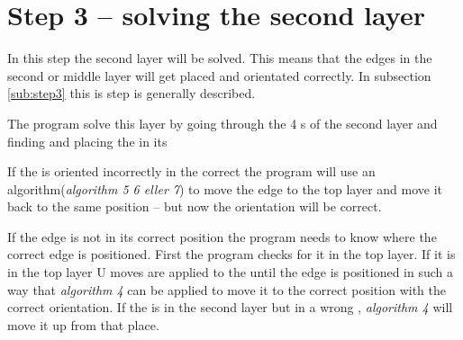 \section{Step 3 -- solving the second layer}
In this step the second layer will be solved. 
This means that the edges in the second or middle layer will get placed and orientated correctly. 
In subsection \ref{sub:step3} this is step is generally described. 

The program solve this layer by going through the 4 \cubicle{}s of the second layer and finding and placing the \cpiece{} in its \cubicle{}

If the \cpiece is oriented incorrectly in the correct \cubicle{} the program will use an algorithm(\textit{algorithm 5 6 eller 7})  to move the edge \cpiece{} to the top layer and move it back to the same position -- but now the orientation will be correct. 

If the edge \cpiece{} is not in its correct position the program needs to know where the correct edge \cpiece{} is positioned. First the program checks for it in the top layer. 
If it is in the top layer U moves are applied to the \rubik{} until the edge \cpiece{} is positioned in such a way that \textit{algorithm 4} can be applied to move it to the correct position with the correct orientation. 
If the \cpiece{} is in the second layer but in a wrong \cubicle{}, \textit{algorithm 4} will move it up from that place. 
